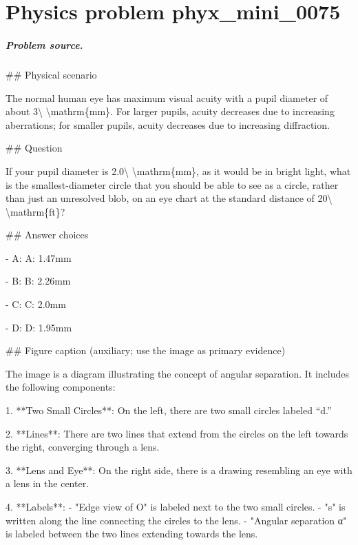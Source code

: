 
\chapter{Physics problem phyx\_mini\_0075}
\label{ch:PhyXMiniProblems_problem_phyx_mini_0075}

\paragraph{Problem source.}
\#\# Physical scenario

The normal human eye has maximum visual acuity with a pupil diameter of about 3\textbackslash{} \textbackslash{}mathrm\{mm\}. For larger pupils, acuity decreases due to increasing aberrations; for smaller pupils, acuity decreases due to increasing diffraction.

\#\# Question

If your pupil diameter is 2.0\textbackslash{} \textbackslash{}mathrm\{mm\}, as it would be in bright light, what is the smallest-diameter circle that you should be able to see as a circle, rather than just an unresolved blob, on an eye chart at the standard distance of 20\textbackslash{} \textbackslash{}mathrm\{ft\}?

\#\# Answer choices

- A: A: 1.47mm

- B: B: 2.26mm

- C: C: 2.0mm

- D: D: 1.95mm

\#\# Figure caption (auxiliary; use the image as primary evidence)

The image is a diagram illustrating the concept of angular separation. It includes the following components:

1. **Two Small Circles**: On the left, there are two small circles labeled “d.”

2. **Lines**: There are two lines that extend from the circles on the left towards the right, converging through a lens.

3. **Lens and Eye**: On the right side, there is a drawing resembling an eye with a lens in the center.

4. **Labels**: 
   - "Edge view of O" is labeled next to the two small circles.
   - "s" is written along the line connecting the circles to the lens.
   - "Angular separation α" is labeled between the two lines extending towards the lens.

